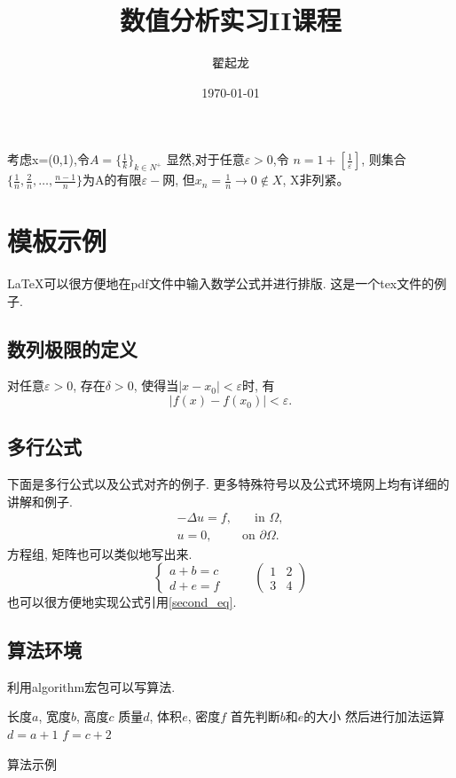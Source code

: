 \documentclass[UTF8]{ctexart}
\begin{document}
\title{数值分析实习II课程}
%
\author{翟起龙}

\date{\today}

\maketitle{}

考虑x=(0,1),令$A=\{\frac{1}{k}\}_{k\in N^{+}}$ 显然,对于任意$\varepsilon>0$,令 $n=1+[\frac{1}{\varepsilon}]$,
则集合$\{\frac{1}{n},\frac{2}{n}, \dots,\frac{n-1}{n}\}$为A的有限$\varepsilon -$网,
但$x_{n}=\frac{1}{n}\rightarrow 0 \notin X$, X非列紧。


\section{模板示例}

LaTeX可以很方便地在pdf文件中输入数学公式并进行排版. 这是一个tex文件的例子.

\subsection{数列极限的定义}

对任意$\varepsilon>0$, 存在$\delta>0$, 使得当$|x-x_0|<\varepsilon$时, 有
\[
|f(x)-f(x_0)|<\varepsilon.
\]

\subsection{多行公式}
下面是多行公式以及公式对齐的例子. 更多特殊符号以及公式环境网上均有详细的讲解和例子.
\begin{align}
	-\Delta u = f,  &\quad\text{in } \Omega, \label{first_eq}
	\\
	u = 0, \quad &\text{on } \partial\Omega. \label{second_eq}
\end{align}
方程组, 矩阵也可以类似地写出来.
\[
\left\{
\begin{aligned}
	a + b = c
	\\
	d + e = f
\end{aligned}
\right.
\hspace{1cm}
\begin{pmatrix}
	1 & 2
	\\
	3 & 4
\end{pmatrix}
\]
也可以很方便地实现公式引用\eqref{second_eq}.

\subsection{算法环境}
利用algorithm宏包可以写算法.
\begin{algorithm}[h]
	\begin{algorithmic}[1]
		\Require 长度$a$, 宽度$b$, 高度$c$
		\Ensure 质量$d$, 体积$e$, 密度$f$
		\State 首先判断$b$和$e$的大小
		\State 然后进行加法运算
		\State $d=a+1$
		\State $f=c+2$
		\EndIf
		\EndFunction
	\end{algorithmic}
	\caption{算法示例}
\end{algorithm}
\end{document}
